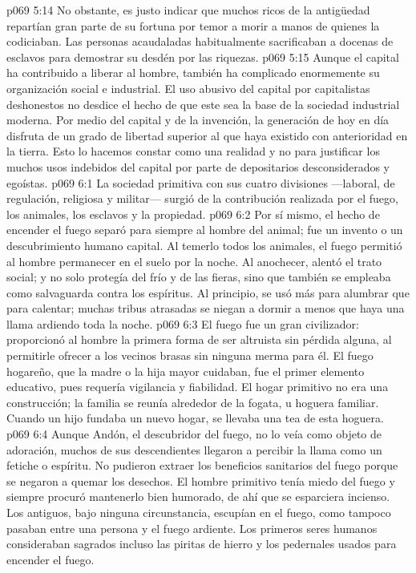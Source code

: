 \vs p069 5:14 No obstante, es justo indicar que muchos ricos de la antigüedad repartían gran parte de su fortuna por temor a morir a manos de quienes la codiciaban. Las personas acaudaladas habitualmente sacrificaban a docenas de esclavos para demostrar su desdén por las riquezas.
\vs p069 5:15 Aunque el capital ha contribuido a liberar al hombre, también ha complicado enormemente su organización social e industrial. El uso abusivo del capital por capitalistas deshonestos no desdice el hecho de que este sea la base de la sociedad industrial moderna. Por medio del capital y de la invención, la generación de hoy en día disfruta de un grado de libertad superior al que haya existido con anterioridad en la tierra. Esto lo hacemos constar como una realidad y no para justificar los muchos usos indebidos del capital por parte de depositarios desconsiderados y egoístas.
\vs p069 6:1 La sociedad primitiva con sus cuatro divisiones ---laboral, de regulación, religiosa y militar--- surgió de la contribución realizada por el fuego, los animales, los esclavos y la propiedad.
\vs p069 6:2 Por sí mismo, el hecho de encender el fuego separó para siempre al hombre del animal; fue un invento o un descubrimiento humano capital. Al temerlo todos los animales, el fuego permitió al hombre permanecer en el suelo por la noche. Al anochecer, alentó el trato social; y no solo protegía del frío y de las fieras, sino que también se empleaba como salvaguarda contra los espíritus. Al principio, se usó más para alumbrar que para calentar; muchas tribus atrasadas se niegan a dormir a menos que haya una llama ardiendo toda la noche.
\vs p069 6:3 El fuego fue un gran civilizador: proporcionó al hombre la primera forma de ser altruista sin pérdida alguna, al permitirle ofrecer a los vecinos brasas sin ninguna merma para él. El fuego hogareño, que la madre o la hija mayor cuidaban, fue el primer elemento educativo, pues requería vigilancia y fiabilidad. El hogar primitivo no era una construcción; la familia se reunía alrededor de la fogata, u hoguera familiar. Cuando un hijo fundaba un nuevo hogar, se llevaba una tea de esta hoguera.
\vs p069 6:4 \pc Aunque Andón, el descubridor del fuego, no lo veía como objeto de adoración, muchos de sus descendientes llegaron a percibir la llama como un fetiche o espíritu. No pudieron extraer los beneficios sanitarios del fuego porque se negaron a quemar los desechos. El hombre primitivo tenía miedo del fuego y siempre procuró mantenerlo bien humorado, de ahí que se esparciera incienso. Los antiguos, bajo ninguna circunstancia, escupían en el fuego, como tampoco pasaban entre una persona y el fuego ardiente. Los primeros seres humanos consideraban sagrados incluso las piritas de hierro y los pedernales usados para encender el fuego.
